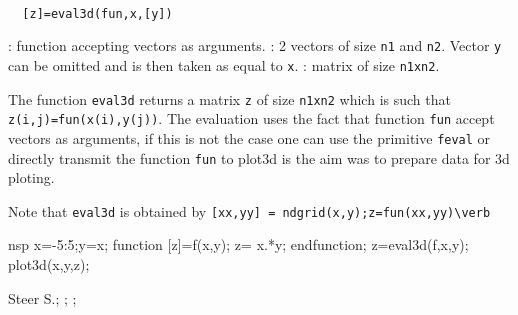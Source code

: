 \begin{mandesc}
  \\
\end{mandesc}
\begin{calling_sequence}
\begin{verbatim}
  [z]=eval3d(fun,x,[y])
\end{verbatim}
\end{calling_sequence}
\begin{parameters}
  \begin{varlist}
    : function accepting vectors as arguments.
    : 2 vectors of size \verb!n1! and \verb!n2!. Vector \verb!y! can be omitted and
    is then taken as equal to \verb!x!.
    : matrix of size \verb!n1xn2!.
  \end{varlist}
\end{parameters}
\begin{mandescription}
  The function \verb!eval3d! returns a matrix \verb!z! of size \verb!n1xn2!
  which is such that \verb!z(i,j)=fun(x(i),y(j))!. The evaluation uses
  the fact that function \verb!fun! accept vectors as arguments, if this is not
  the case one can use the primitive \verb!feval! or directly transmit the function
  \verb!fun! to plot3d is the aim was to prepare data for 3d ploting.

  Note that \verb!eval3d! is obtained by \verb![xx,yy] = ndgrid(x,y);z=fun(xx,yy)\verb!
\end{mandescription}

\begin{examples}
  \begin{mintednsp}{nsp}
    x=-5:5;y=x;
    function [z]=f(x,y); z= x.*y; endfunction;
    z=eval3d(f,x,y);
    plot3d(x,y,z);
  \end{mintednsp}
\end{examples}

\begin{manseealso}
\end{manseealso}


\begin{authors}
  Steer S.; ; ;

\end{authors}
